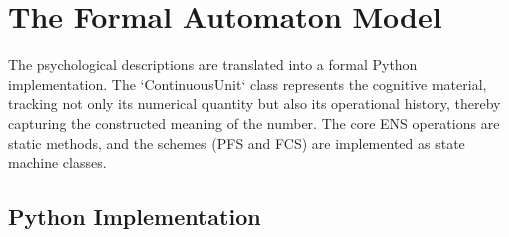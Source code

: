 \documentclass{article}
\begin{document}
\section{The Formal Automaton Model}

The psychological descriptions are translated into a formal Python implementation. The `ContinuousUnit` class represents the cognitive material, tracking not only its numerical quantity but also its operational history, thereby capturing the constructed meaning of the number. The core ENS operations are static methods, and the schemes (PFS and FCS) are implemented as state machine classes.

\subsection{Python Implementation}
\end{document}
